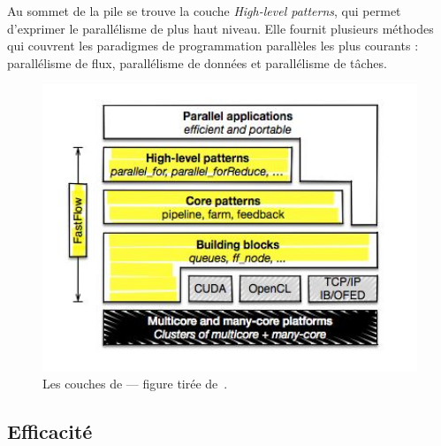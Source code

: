 Au sommet de la pile se trouve la couche \emph{High-level patterns}, qui permet d'exprimer le parall\'elisme de plus haut niveau. Elle fournit plusieurs m\'ethodes qui couvrent les paradigmes de programmation parall\`eles les plus courants : parall\'elisme de flux, parall\'elisme de donn\'ees et  parall\'elisme de t\^aches. 

\begin{figure}[ht]
\centering
     \includegraphics[width=1.0\textwidth]{Figures/FastFlowLayers.jpg}
      \caption[Les couches de .]{Les couches de  --- figure tir\'ee de~\cite{Torquati15}.}
       \label{FastFlowLayers.fig}
\end{figure}

\subsection{Efficacit\'e}

